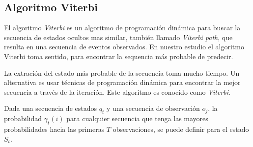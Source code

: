 \subsection{Algoritmo Viterbi}

El algoritmo \emph{Viterbi} es un algoritmo de programación dinámica para buscar la secuencia de estados ocultos mas similar, también llamado \emph{Viterbi path}, que resulta en una secuencia de eventos observados. En nuestro estudio el algoritmo Viterbi toma sentido, para encontrar la sequencia más probable de predecir.

La extración del  estado más probable de la secuencia toma mucho tiempo. Un alternativa es usar técnicas de programación dinámica para encontrar la mejor secuencia %
a través de la iteración. Este algoritmo es conocido como \emph{Viterbi}. 

Dada una secuencia de estados $q_{t}$ y una secuencia de observación  $o_{j}$, la probabilidad $\gamma_{t}(i)$ 
para cualquier secuencia que tenga las mayores probabilidades hacia  las primeras $T$ observaciones, se puede definir para el estado $S_{t}$.



